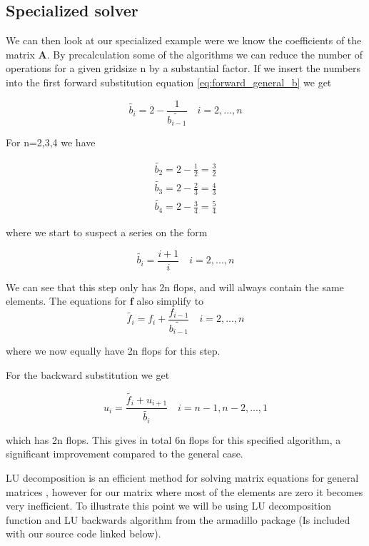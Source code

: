 \documentclass[a4paper,11pt]{article}
\begin{document}
{		\subsection{Specialized solver}
We can then look at our specialized example were we know the coefficients of the matrix $\mathbf{A}$. By precalculation some of the algorithms we can reduce the number of operations for a given gridsize n by a substantial factor. If we insert the numbers into the first forward substitution equation \ref{eq:forward_general_b} we get
		
\begin{equation}
\tilde{b_i}=2-\frac{1}{\tilde{b_{i-1}}}\quad i = 2, ..., n
\end{equation}
		
For n=2,3,4 we have 
		
\begin{align}
\tilde{b_2}=2-\frac{1}{2}=\frac{3}{2} \\
\tilde{b_3}=2-\frac{2}{3}=\frac{4}{3} \\
\tilde{b_4}=2-\frac{3}{4}=\frac{5}{4}
\end{align}
	
where we start to suspect a series on the form
		
\begin{equation}
\tilde{b_i}=\frac{i+1}{i}  \quad i = 2, ..., n
\label{eq:forward_specific_b}
\end{equation}
		
We can see that this step only has 2n flops, and will always contain the same elements. The equations for $\mathbf{f}$ also simplify to
\begin{equation}
\tilde{f_i}=f_{i}+\frac{f_{i-1}}{\tilde{b_{i-1}}}\quad i = 2, ..., n
\label{eq:forward_specific_f}
\end{equation}
		
where we now equally have 2n flops for this step. 
		
For the backward substitution we get 
		
\begin{equation}
u_i = \frac{\tilde{f_i} + u_{i+1}}{\tilde{b_i}}\quad i = n-1, n-2, ..., 1
\label{eq:forward_specific_u}
\end{equation}
		
which has 2n flops. 
This gives in total 6n flops for this specified algorithm, a significant improvement compared to the general case. 


LU decomposition is an efficient method for solving matrix equations for general matrices \cite{M.Hjort-Jensen_CompFys}, however for our matrix where most of the elements are zero it becomes very inefficient. To illustrate this point we will be using LU decomposition function and LU backwards algorithm from the armadillo package (Is included with our source code linked below). 

}
\end{document}

